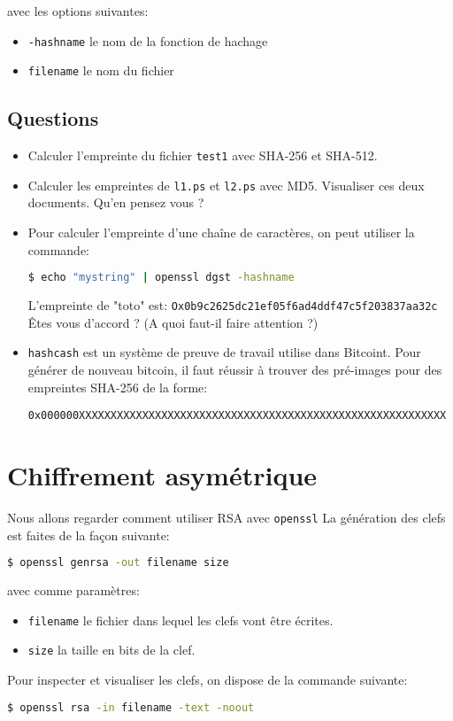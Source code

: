 \documentclass{article}
\begin{document}
avec les options suivantes:
\begin{itemize}
\item  \texttt{-hashname} le nom de la fonction de hachage
\item  \texttt{filename} le nom du fichier
\end{itemize}



\subsection*{Questions}
\begin{itemize}
\item Calculer l’empreinte du fichier \texttt{test1} avec SHA-256 et SHA-512.

\item Calculer les empreintes de  \texttt{l1.ps} et  \texttt{l2.ps} avec MD5. Visualiser ces deux documents. Qu'en pensez vous ?

\item Pour calculer l’empreinte d’une chaîne de caractères, on peut utiliser la commande:
\begin{lstlisting}[language=bash]
$ echo "mystring" | openssl dgst -hashname
\end{lstlisting}

L’empreinte de "toto" est:
\texttt{Ox0b9c2625dc21ef05f6ad4ddf47c5f203837aa32c}
Êtes vous d’accord ? (A quoi faut-il faire attention ?)
\item \texttt{hashcash} est un système de preuve de travail utilise dans Bitcoint. Pour générer de
nouveau bitcoin, il faut réussir à trouver des pré-images pour des empreintes SHA-256 de la forme:
\begin{center}
\texttt{0x000000XXXXXXXXXXXXXXXXXXXXXXXXXXXXXXXXXXXXXXXXXXXXXXXXXXXXXXXXXX}
\end{center}
\end{itemize}

\section{Chiffrement asymétrique}
Nous allons regarder comment utiliser RSA avec \texttt{openssl} La génération des clefs est faites de la
façon suivante:
\begin{lstlisting}[language=bash]
$ openssl genrsa -out filename size
\end{lstlisting}
avec comme paramètres:
\begin{itemize}
\item \texttt{filename} le fichier dans lequel les clefs vont être écrites.
\item \texttt{size} la taille en bits de la clef.
\end{itemize}
Pour inspecter et visualiser les clefs, on dispose de la commande suivante:
\begin{lstlisting}[language=bash]
$ openssl rsa -in filename -text -noout
\end{lstlisting}
\end{document}
